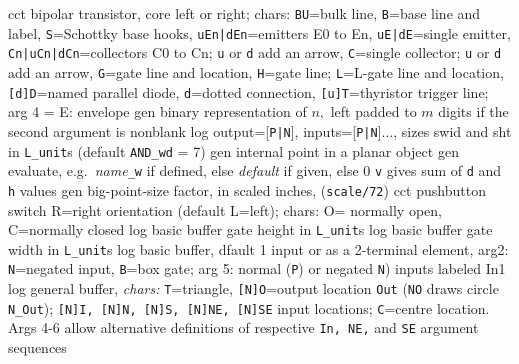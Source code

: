   {cct}
  { bipolar transistor, core left or right; chars:
   {\tt BU}=bulk line,
   {\tt B}=base line and label,
   {\tt S}=Schottky base hooks,
   {\tt uEn|dEn}=emitters E0 to En,
   {\tt uE|dE}=single emitter,
   {\tt Cn|uCn|dCn}=collectors C0 to Cn; {\tt u} or {\tt d} add an arrow,
   {\tt C}=single collector; {\tt u} or {\tt d} add an arrow,
   {\tt G}=gate line and location,
   {\tt H}=gate line; {\tt L}=L-gate line and location,
   {\tt [d]D}=named parallel diode,
   {\tt d}=dotted connection,
   {\tt [u]T}=thyristor trigger line;
   arg 4 = E: envelope
    }
  {gen}
  {binary representation of $n,$ left padded to $m$ digits if the second
   argument is nonblank}
  {log}
  {output=[{\tt P|N}], inputs=[{\tt P|N}]$\ldots$, sizes swid and sht
  in {\tt L\_unit}s (default {\tt AND\_wd} = 7)
    }
  {gen}
  {internal point in a planar object}
  {gen}
  {evaluate, e.g.\ {\sl name}{\tt \_w} if defined, else {\sl default\/}
   if given, else 0 {\tt v} gives sum of {\tt d} and {\tt h} values
     }
  {gen}
  {big-point-size factor, in scaled inches, ({\tt *scale/72})}
  {cct}
  {pushbutton switch R=right orientation (default L=left);
     chars: O= normally open, C=normally closed }
  {log}
  {basic buffer gate height in {\tt L\_unit}s}
  {log}
  {basic buffer gate width in {\tt L\_unit}s}
  {log}
  {basic buffer, dfault 1 input or as a 2-terminal element,
    arg2: {\tt N}=negated input, {\tt B}=box gate; arg 5:
    normal ({\tt P}) or negated {\tt N}) inputs labeled In1 
    }
  {log}
  {general buffer, {\sl chars:} {\tt T}=triangle,
            {\tt [N]O}=output location {\tt Out}
            ({\tt NO} draws circle {\tt N\_Out});
            {\tt [N]I, [N]N, [N]S, [N]NE, [N]SE}
            input locations; {\tt C}=centre location.
            Args 4-6 allow alternative
            definitions of respective {\tt In, NE,}
            and {\tt SE} argument sequences }
